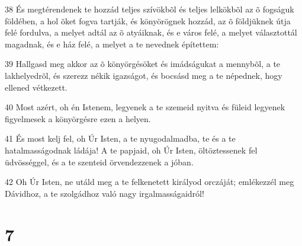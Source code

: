 \par 38 És megtérendenek te hozzád teljes szívökbõl és teljes lelkökbõl az õ fogságuk földében, a hol õket fogva tartják, és könyörögnek hozzád, az õ földjüknek útja felé fordulva, a melyet adtál az õ atyáiknak, és e város felé, a melyet választottál magadnak, és e ház felé, a melyet a te nevednek építettem:
\par 39 Hallgasd meg akkor az õ könyörgésöket és imádságukat a mennybõl, a te lakhelyedrõl, és szerezz nékik igazságot, és bocsásd meg a te népednek, hogy ellened vétkezett.
\par 40 Most azért, oh én Istenem, legyenek a te szemeid nyitva és füleid legyenek figyelmesek a könyörgésre ezen a helyen.
\par 41 És most kelj fel, oh Úr Isten, a te nyugodalmadba,  te és a te hatalmasságodnak ládája! A te papjaid, oh Úr Isten, öltöztessenek fel üdvösséggel, és a te szenteid örvendezzenek a jóban.
\par 42 Oh Úr Isten, ne utáld meg a te felkenetett királyod orczáját; emlékezzél meg Dávidhoz, a te szolgádhoz való nagy irgalmasságaidról!

\chapter{7}


